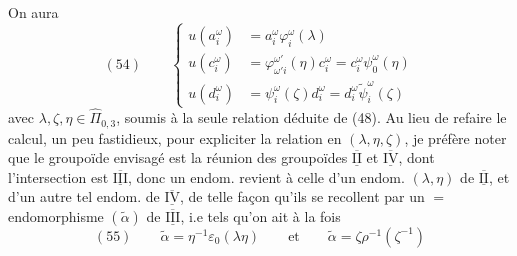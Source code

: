 On aura
\[
(54)\qquad\left\{\begin{aligned}
u(a_i^\omega)&=a_i^\omega\varphi_i^\omega(\lambda)\\
u(c_i^\omega)&=\varphi_{\omega'i}^{\omega'}(\eta)c_i^\omega=c_i^\omega\psi_{0}^\omega(\eta)\\
u(d_i^\omega)&=\psi_i^\omega(\zeta)d_i^\omega=d_i^\omega\widetilde\psi_i^\omega(\zeta)
\end{aligned}\right.
\]
avec $\lambda,\zeta,\eta\in\widehat\Pi_{0,3}$, soumis à la seule relation déduite de (48). Au lieu de refaire le calcul, un peu fastidieux, pour expliciter la relation en $(\lambda,\eta,\zeta)$, je préfère noter que le  groupoïde envisagé est la réunion des groupoïdes $\overline{\underline{\mathrm{II}}}$ et $\overline{\underline{\mathrm{IV}}}$, dont l'intersection est $\overline{\underline{\mathrm{III}}}$, donc un endom.  revient à celle d'un  endom. $(\lambda,\eta)$ de $\overline{\underline{\mathrm{II}}}$, et d'un autre tel endom. \inserted{$\zeta$} de $\overline{\underline{\mathrm{IV}}}$, de telle façon qu'ils se recollent  par un $=$ endomorphisme $(\widetilde\alpha)$ de $\overline{\underline{\mathrm{III}}}$, i.e tels qu'on ait à la fois
\[
(55)\qquad\widetilde\alpha=\eta^{-1}\varepsilon_0(\lambda\eta)\qquad\text{et}\qquad
\widetilde\alpha=\zeta\rho^{-1}(\zeta^{-1})
\]

